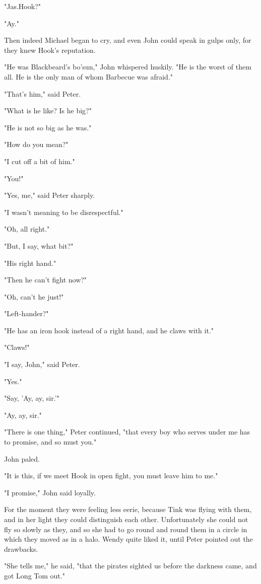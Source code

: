 "Jas.\@ Hook?"

"Ay."

Then indeed Michael began to cry, and even John could speak in gulps only, for they knew Hook's reputation.

"He was Blackbeard's bo'sun," John whispered huskily.
"He is the worst of them all.
He is the only man of whom Barbecue was afraid."

"That's him," said Peter.

"What is he like?
Is he big?"

"He is not so big as he was."

"How do you mean?"

"I cut off a bit of him."

"You!"

"Yes, me," said Peter sharply.

"I wasn't meaning to be disrespectful."

"Oh, all right."

"But, I say, what bit?"

"His right hand."

"Then he can't fight now?"

"Oh, can't he just!"

"Left-hander?"

"He has an iron hook instead of a right hand, and he claws with it."

"Claws!"

"I say, John," said Peter.

"Yes."

"Say, 'Ay, ay, sir.'"

"Ay, ay, sir."

"There is one thing," Peter continued, "that every boy who serves under me has to promise, and so must you."

John paled.

"It is this, if we meet Hook in open fight, you must leave him to me."

"I promise," John said loyally.

For the moment they were feeling less eerie, because Tink was flying with them, and in her light they could distinguish each other.
Unfortunately she could not fly so slowly as they, and so she had to go round and round them in a circle in which they moved as in a halo.
Wendy quite liked it, until Peter pointed out the drawbacks.

"She tells me," he said, "that the pirates sighted us before the darkness came, and got Long Tom out."

